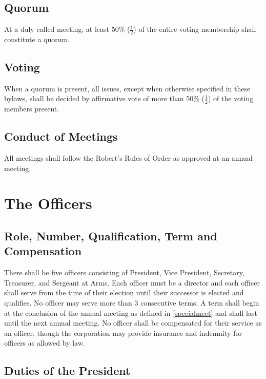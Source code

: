 \documentclass[10pt,letterpaper,titlepage]{article}
\begin{document}
\subsection{Quorum}
 
At a duly called meeting, at least 50\% ($\frac{1}{2}$) of the entire voting
membership shall constitute a quorum. 

\subsection{Voting}
 
When a quorum is present, all issues, except when otherwise specified in these
bylaws, shall be decided by affirmative vote of more than 50\% ($\frac{1}{2}$)
of the voting members present. 

\subsection{Conduct of Meetings}
\label{condofmeet}
 
All meetings shall follow the Robert's Rules of Order as approved at an annual
meeting.

\section{The Officers}
\label{officers}

\subsection{Role, Number, Qualification, Term and Compensation}
 
There shall be five officers consisting of President, Vice President,
Secretary, Treasurer, and Sergeant at Arms.
Each officer must be a director and each officer shall serve from the time of
their election until their successor is elected and qualifies.
No officer may serve more than 3 consecutive terms.
A term shall begin at the conclusion of the annual meeting as defined in
\ref{specialmeet} and shall last until the next annual meeting.
No officer shall be compensated for their service as an officer, though the
corporation may provide insurance and indemnity for officers as allowed by law.

\subsection{Duties of the President}
\end{document}
